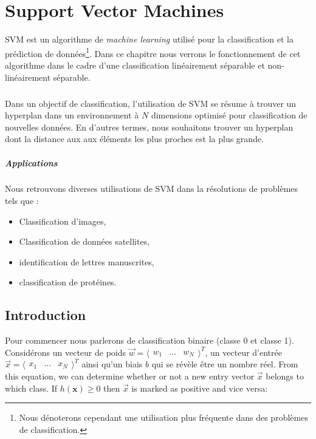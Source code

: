 \chapter{Support Vector Machines}

\gls{SVM} est un algorithme de \textit{machine learning} utilisé pour la classification et la prédiction de données\footnote{Nous dénoterons cependant une utilisation plus fréquente dans des problèmes de classification.}.
Dans ce chapitre nous verrons le fonctionnement de cet algorithme dans le cadre d'une classification linéairement séparable et non-linéairement séparable.

\paragraph{}

Dans un objectif de classification, l'utilisation de \gls{SVM} se résume à trouver un hyperplan dans un environnement à $N$ dimensions optimisé pour classification de nouvelles données.
En d'autres termes, nous souhaitons trouver un hyperplan dont la distance aux aux éléments les plus proches est la plus grande.

\paragraph{Applications}
Nous retrouvons diverses utilisations de \gls{SVM} dans la résolutions de problèmes tels que : 
\begin{itemize}
	\item Classification d'images,
	\item Classification de donn\'ees satellites,
	\item identification de lettres manuscrites,
	\item classification de prot\'eines.
\end{itemize}

\section{Introduction}

Pour commencer nous parlerons de classification binaire (classe 0 et classe 1). Considérons un vecteur de poids $\vec w = \langle \begin{matrix} w_1 & \dots & w_N \end{matrix} \rangle^T$, un vecteur d'entrée $\vec x = \langle \begin{matrix} x_1 & \dots & x_N \end{matrix} \rangle^T$ ainsi qu'un biais $b$ qui se révèle être un nombre réel.
From this equation, we can determine whether or not a new entry vector $\vec x$ belongs to which class.
If $h(\mathbf x) \geq 0$ then $\vec x$ is marked as positive and vice versa:

